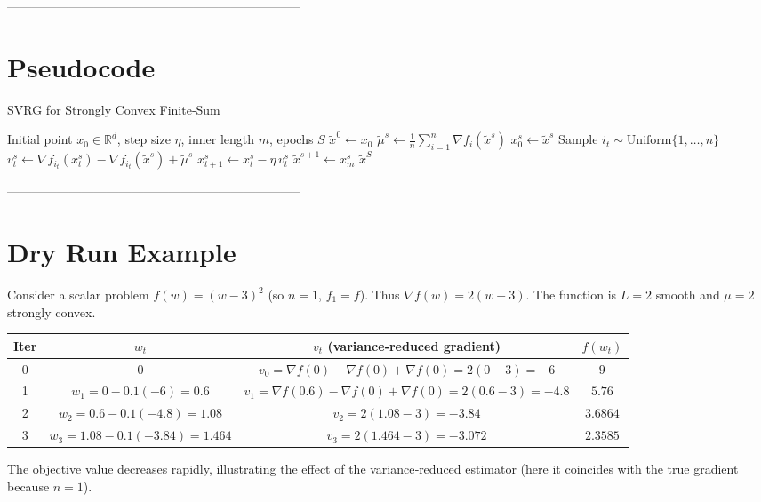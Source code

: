 \documentclass{article}
\newcommand{\grad}{\nabla}
\newcommand{\R}{\mathbb{R}}
\begin{document}
-----------------------------------------------------------------------

\section*{Pseudocode}
\begin{algorithm}[H]
\caption{SVRG for Strongly Convex Finite‑Sum}
\begin{algorithmic}[1]
\Require Initial point $x_{0}\in\R^{d}$, step size $\eta$, inner length $m$, epochs $S$
\State $\tilde{x}^{0}\gets x_{0}$
    \State $\tilde{\mu}^{s}\gets \frac1n\sum_{i=1}^{n}\grad f_i(\tilde{x}^{s})$ 
    \State $x_{0}^{s}\gets \tilde{x}^{s}$
        \State Sample $i_t\sim\text{Uniform}\{1,\dots,n\}$
        \State $v_{t}^{s}\gets \grad f_{i_t}(x_{t}^{s})-\grad f_{i_t}(\tilde{x}^{s})+\tilde{\mu}^{s}$
        \State $x_{t+1}^{s}\gets x_{t}^{s}-\eta\,v_{t}^{s}$
    \EndFor
    \State $\tilde{x}^{s+1}\gets x_{m}^{s}$
\EndFor
\State \Return $\tilde{x}^{S}$
\end{algorithmic}
\end{algorithm}

-----------------------------------------------------------------------

\section*{Dry Run Example}
Consider a scalar problem $f(w)=(w-3)^2$ (so $n=1$, $f_1=f$).  
Thus $\grad f(w)=2(w-3)$.  The function is $L=2$ smooth and $\mu=2$ strongly convex.

\begin{center}
\begin{tabular}{c|c|c|c}
\textbf{Iter} & $w_t$ & $v_t$ (variance‑reduced gradient) & $f(w_t)$\\\hline
0 & $0$ & $v_0 = \grad f(0)-\grad f(0)+\grad f(0)=2(0-3)=-6$ & $9$\\
1 & $w_1 = 0-0.1(-6)=0.6$ & $v_1 = \grad f(0.6)-\grad f(0)+\grad f(0)=2(0.6-3)=-4.8$ & $5.76$\\
2 & $w_2 = 0.6-0.1(-4.8)=1.08$ & $v_2 = 2(1.08-3)=-3.84$ & $3.6864$\\
3 & $w_3 = 1.08-0.1(-3.84)=1.464$ & $v_3 = 2(1.464-3)=-3.072$ & $2.3585$\\
\end{tabular}
\end{center}
The objective value decreases rapidly, illustrating the effect of the variance‑reduced estimator (here it coincides with the true gradient because $n=1$).
\end{document}
